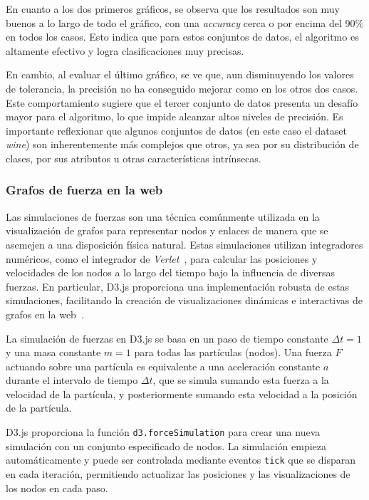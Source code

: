 En cuanto a los dos primeros gráficos, se observa que los resultados son muy buenos a lo largo de todo el gráfico, con una \textit{accuracy} cerca o por encima del 90\% en todos los casos. Esto indica que para estos conjuntos de datos, el algoritmo es altamente efectivo y logra clasificaciones muy precisas.

En cambio, al evaluar el último gráfico, se ve que, aun disminuyendo los valores de tolerancia, la precisión no ha conseguido mejorar como en los otros dos casos. Este comportamiento sugiere que el tercer conjunto de datos presenta un desafío mayor para el algoritmo, lo que impide alcanzar altos niveles de precisión. Es importante reflexionar que algunos conjuntos de datos (en este caso el dataset \textit{wine}) son inherentemente más complejos que otros, ya sea por su distribución de clases, por sus atributos u otras características intrínsecas.

\subsubsection{Grafos de fuerza en la web}
Las simulaciones de fuerzas son una técnica comúnmente utilizada en la visualización de grafos para representar nodos y enlaces de manera que se asemejen a una disposición física natural. Estas simulaciones utilizan integradores numéricos, como el integrador de \textit{Verlet}~\cite{enwiki:verlet}, para calcular las posiciones y velocidades de los nodos a lo largo del tiempo bajo la influencia de diversas fuerzas. En particular, D3.js proporciona una implementación robusta de estas simulaciones, facilitando la creación de visualizaciones dinámicas e interactivas de grafos en la web~\cite{d3-simulation}.

La simulación de fuerzas en D3.js se basa en un paso de tiempo constante $\Delta t = 1$ y una masa constante $m = 1$ para todas las partículas (nodos). Una fuerza $F$ actuando sobre una partícula es equivalente a una aceleración constante $a$ durante el intervalo de tiempo $\Delta t$, que se simula sumando esta fuerza a la velocidad de la partícula, y posteriormente sumando esta velocidad a la posición de la partícula.

D3.js proporciona la función \texttt{d3.forceSimulation} para crear una nueva simulación con un conjunto especificado de nodos. La simulación empieza automáticamente y puede ser controlada mediante eventos \texttt{tick} que se disparan en cada iteración, permitiendo actualizar las posiciones y las visualizaciones de los nodos en cada paso.

